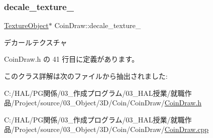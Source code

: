 \subsubsection{\texorpdfstring{decale\+\_\+texture\+\_\+}{decale\_texture\_}}
{\footnotesize\ttfamily \mbox{\hyperlink{class_texture_object}{Texture\+Object}}$\ast$ Coin\+Draw\+::decale\+\_\+texture\+\_\+\hspace{0.3cm}{\ttfamily [private]}}



デカールテクスチャ 



 Coin\+Draw.\+h の 41 行目に定義があります。



このクラス詳解は次のファイルから抽出されました\+:\begin{DoxyCompactItemize}
\item 
C\+:/\+H\+A\+L/\+P\+G関係/03\+\_\+作成プログラム/03\+\_\+\+H\+A\+L授業/就職作品/\+Project/source/03\+\_\+\+Object/3\+D/\+Coin/\+Coin\+Draw/\mbox{\hyperlink{_coin_draw_8h}{Coin\+Draw.\+h}}\item 
C\+:/\+H\+A\+L/\+P\+G関係/03\+\_\+作成プログラム/03\+\_\+\+H\+A\+L授業/就職作品/\+Project/source/03\+\_\+\+Object/3\+D/\+Coin/\+Coin\+Draw/\mbox{\hyperlink{_coin_draw_8cpp}{Coin\+Draw.\+cpp}}\end{DoxyCompactItemize}
